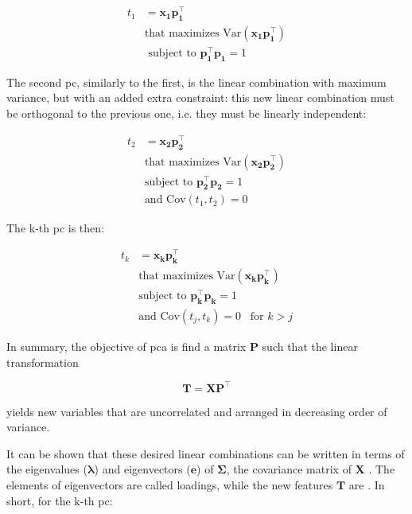 \begin{equation}
	\label{eqn:pca-pc1}
	\begin{split}
		t_1 & =\mathbf{x_1 p_1^\intercal} \\
			   & \text{that maximizes Var}(\mathbf{x_1 p_1^\intercal}) \\
			   & \text{ subject to }  \mathbf{p_1^\intercal p_1} = 1
	\end{split}
\end{equation}

The second \acrshort{pc}, similarly to the first, is the linear combination with maximum variance, but with an added extra constraint: this new linear combination must be orthogonal to the previous one, i.e. they must be linearly independent:

\begin{equation}
	\label{eqn:pca-pc2}
	\begin{split}
		t_2 & =\mathbf{x_2 p_2^\intercal} \\
		& \text{that maximizes Var}(\mathbf{x_2 p_2^\intercal}) \\
		& \text{subject to }  \mathbf{p_2^\intercal p_2} = 1 \\
		& \text{and } \text{Cov}(t_1, t_2) = 0
	\end{split}
\end{equation}

The k-th \acrshort{pc} is then:

\begin{equation}
	\label{eqn:pca-pck}
	\begin{split}
		t_k & =\mathbf{x_k p_k^\intercal} \\
		& \text{that maximizes Var}(\mathbf{x_k p_k^\intercal}) \\
		& \text{subject to }  \mathbf{p_k^\intercal p_k} = 1 \\
		& \text{and } \text{Cov}(t_j, t_k) = 0 \;\;\; \text{for } k>j
	\end{split}
\end{equation}

In summary, the objective of \acrshort{pca} is find a matrix $\mathbf{P}$ such that the linear transformation

\begin{equation}
	\label{eqn:pca}
	\mathbf{T=XP^\intercal}
\end{equation}

yields new variables that are uncorrelated and arranged in decreasing order of variance.

It can be shown that these desired linear combinations can be written in terms of the eigenvalues ($\mathbf{\lambda}$) and eigenvectors ($\mathbf{e}$) of $\mathbf{\Sigma}$, the covariance matrix of $\mathbf{X}$ \parencite{johnson2013applied}. The elements of eigenvectors are called loadings, while the new features $\mathbf{T}$ are 
. In short, for the k-th \acrshort{pc}:

